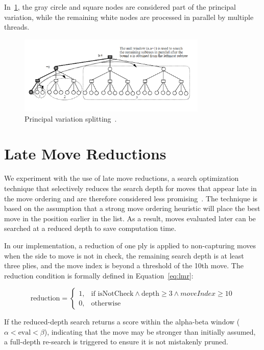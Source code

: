 \vspace{1em}

\noindent In~\cref{fig:pvsplitting}, the gray circle and square nodes are considered part of the principal variation, while the remaining white nodes are processed in parallel by multiple threads.

\begin{figure}
   \centering
   \includegraphics[width=0.8\textwidth]{Imagenes/Bitmap/pvsplitting.png}
   \caption{Principal variation splitting~\cite{PVSplitting}.}\label{fig:pvsplitting}
\end{figure}

\newpage
\section{Late Move Reductions}

\noindent We experiment with the use of late move reductions, a search optimization technique that selectively reduces the search depth for moves that appear late in the move ordering and are therefore considered less promising~\cite{LateMoveReductions}. The technique is based on the assumption that a strong move ordering heuristic will place the best move in the position earlier in the list. As a result, moves evaluated later can be searched at a reduced depth to save computation time.

\vspace{1em}

\par
In our implementation, a reduction of one ply is applied to non-capturing moves when the side to move is not in check, the remaining search depth is at least three plies, and the move index is beyond a threshold of the 10th move. The reduction condition is formally defined in Equation~\ref{eq:lmr}:

\vspace{1em}

\begin{equation}
\text{reduction} = 
\begin{cases}
1, & \text{if } \text{isNotCheck} \wedge \text{depth} \geq 3 \wedge moveIndex \geq 10 \\
0, & \text{otherwise}
\end{cases}
\label{eq:lmr}
\end{equation}

\vspace{1em}

\par
If the reduced-depth search returns a score within the alpha-beta window ($\alpha < \text{eval} < \beta$), indicating that the move may be stronger than initially assumed, a full-depth re-search is triggered to ensure it is not mistakenly pruned.


